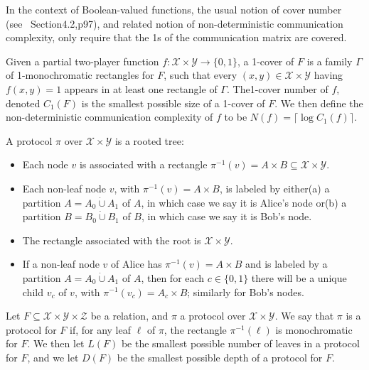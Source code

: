 In the context of Boolean-valued functions, the usual notion of cover number (see~\cite{ref42} Section4.2,p97), and related notion of non-deterministic communication complexity, only require that the 1s of the communication matrix are covered.
\begin{ntdefinition}
Given a partial two-player function $f:\mathcal X\times\mathcal Y\to\{0,1\}$, a 1-cover of $F$ is a family $\Gamma$ of 1-monochromatic rectangles for $F$, such that every $(x,y)\in\mathcal X\times\mathcal Y$ having $f(x,y)=1$ appears in at least one rectangle of $\Gamma$. The1-cover number of $f$, denoted $C_1(F)$ is the smallest possible size of a 1-cover of $F$. We then define the non-deterministic communication complexity of $f$ to be $N(f)=\lceil\log C_1(f)\rceil$.
\end{ntdefinition}
\begin{ntdefinition}
A protocol $\pi$ over $\mathcal X\times\mathcal Y$ is a rooted tree:
\begin{itemize}
\item Each node $v$ is associated with a rectangle $\pi^{-1}(v)=A\times B\subseteq\mathcal X\times\mathcal Y$.
\item Each non-leaf node $v$, with $\pi^{-1}(v)=A\times B$, is labeled by either(a) a partition $A=A_0\mathbin{\dot\cup}A_1$ of $A$, in which case we say it is Alice's node or(b) a partition $B=B_0\mathbin{\dot\cup}B_1$ of $B$, in which case we say it is Bob's node.
\item The rectangle associated with the root is $\mathcal X\times\mathcal Y$.
\item If a non-leaf node $v$ of Alice has $\pi^{-1}(v)=A\times B$ and is labeled by a partition $A=A_0\mathbin{\dot\cup}A_1$ of $A$, then for each $c\in\{0,1\}$ there will be a unique child $v_c$ of $v$, with $\pi^{-1}(v_c)=A_c\times B$; similarly for Bob's nodes.
\end{itemize}
\end{ntdefinition}
\begin{ntdefinition}
Let $F\subseteq\mathcal X\times\mathcal Y\times\mathcal Z$ be a relation, and $\pi$ a protocol over $\mathcal X\times\mathcal Y$. We say that $\pi$ is a protocol for $F$ if, for any leaf $\ell$ of $\pi$, the rectangle $\pi^{-1}(\ell)$ is monochromatic for $F$. We then let $L(F)$ be the smallest possible number of leaves in a protocol for $F$, and we let $D(F)$ be the smallest possible depth of a protocol for $F$.
\end{ntdefinition}
